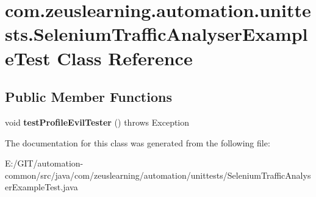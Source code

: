 \hypertarget{classcom_1_1zeuslearning_1_1automation_1_1unittests_1_1SeleniumTrafficAnalyserExampleTest}{}\section{com.\+zeuslearning.\+automation.\+unittests.\+Selenium\+Traffic\+Analyser\+Example\+Test Class Reference}
\label{classcom_1_1zeuslearning_1_1automation_1_1unittests_1_1SeleniumTrafficAnalyserExampleTest}
\subsection*{Public Member Functions}
\begin{DoxyCompactItemize}
\item 
\hypertarget{classcom_1_1zeuslearning_1_1automation_1_1unittests_1_1SeleniumTrafficAnalyserExampleTest_ad6aaf39cd91c8ff639879c17634f1038}{}\label{classcom_1_1zeuslearning_1_1automation_1_1unittests_1_1SeleniumTrafficAnalyserExampleTest_ad6aaf39cd91c8ff639879c17634f1038} 
void {\bfseries test\+Profile\+Evil\+Tester} ()  throws Exception 
\end{DoxyCompactItemize}


The documentation for this class was generated from the following file\+:\begin{DoxyCompactItemize}
\item 
E\+:/\+G\+I\+T/automation-\/common/src/java/com/zeuslearning/automation/unittests/Selenium\+Traffic\+Analyser\+Example\+Test.\+java\end{DoxyCompactItemize}
